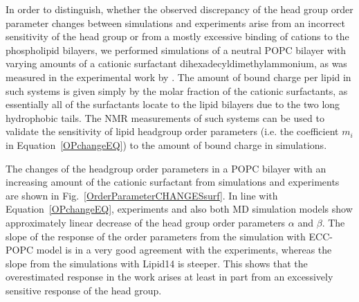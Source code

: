  

In order to distinguish, whether the observed discrepancy of the head group order parameter changes between simulations and experiments 
arise from an incorrect sensitivity of the head group or from a mostly excessive binding of cations to the phospholipid bilayers,
we performed simulations of a neutral POPC bilayer with varying amounts of a cationic surfactant dihexadecyldimethylammonium, 
as was measured in the experimental work by \citet{scherer89}.
The amount of bound charge per lipid
in such systems is given simply by the molar fraction of the cationic surfactants, 
as essentially all of the surfactants locate to the lipid bilayers 
due to the two long hydrophobic tails.
The NMR measurements of such systems  
can be used to validate the sensitivity of lipid headgroup order parameters 
(i.e. the coefficient $m_i$ in Equation~\ref{OPchangeEQ}) 
to the amount of bound charge in simulations. 

The changes of the headgroup order parameters in a POPC bilayer with an increasing amount of 
the cationic surfactant from simulations and experiments~\citep{scherer89} are shown in Fig.~\ref{OrderParameterCHANGESsurf}.
In line with Equation~\ref{OPchangeEQ},
experiments and also both MD simulation models show approximately linear decrease of the head group order parameters $\alpha$ and $\beta$.
The slope of the response of the order parameters %
from the simulation with ECC-POPC model 
is in a very good agreement with the experiments, 
whereas the slope from the simulations with Lipid14 is steeper. 
This shows that the overestimated response in the work \citep{catte16}
arises at least in part from an excessively sensitive response of the head group. 

